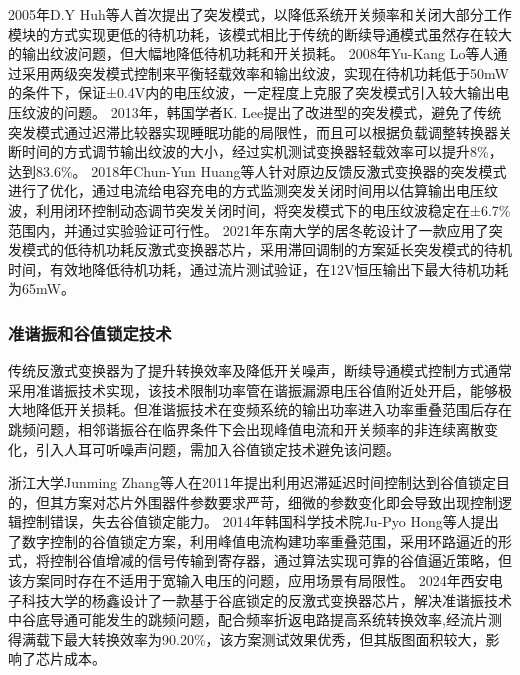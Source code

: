 2005年D.Y Huh等人\cite{choi2005_BM1}首次提出了突发模式，以降低系统开关频率和关闭大部分工作模块的方式实现更低的待机功耗，该模式相比于传统的断续导通模式虽然存在较大的输出纹波问题，但大幅地降低待机功耗和开关损耗。
2008年Yu-Kang Lo等人\cite{lo2008_BM2}通过采用两级突发模式控制来平衡轻载效率和输出纹波，实现在待机功耗低于50mW的条件下，保证±0.4V内的电压纹波，一定程度上克服了突发模式引入较大输出电压纹波的问题。
2013年，韩国学者K. Lee\cite{lee2013improvement_BM}提出了改进型的突发模式，避免了传统突发模式通过迟滞比较器实现睡眠功能的局限性，而且可以根据负载调整转换器关断时间的方式调节输出纹波的大小，经过实机测试变换器轻载效率可以提升8\%，达到83.6\%。
2018年Chun-Yun Huang等人\cite{huang2018primary_BM}针对原边反馈反激式变换器的突发模式进行了优化，通过电流给电容充电的方式监测突发关闭时间用以估算输出电压纹波，利用闭环控制动态调节突发关闭时间，将突发模式下的电压纹波稳定在±6.7\%范围内，并通过实验验证可行性。
2021年东南大学的居冬乾\cite{1022468700.nh}设计了一款应用了突发模式的低待机功耗反激式变换器芯片，采用滞回调制的方案延长突发模式的待机时间，有效地降低待机功耗，通过流片测试验证，在12V恒压输出下最大待机功耗为65mW。

\subsubsection{准谐振和谷值锁定技术}

传统反激式变换器为了提升转换效率及降低开关噪声，断续导通模式控制方式通常采用准谐振技术\cite{kwon2010single,li2022adaptive,xue2022implementation,tran2024development}实现，该技术限制功率管在谐振漏源电压谷值附近处开启，能够极大地降低开关损耗。但准谐振技术在变频系统的输出功率进入功率重叠范围后存在跳频问题，相邻谐振谷在临界条件下会出现峰值电流和开关频率的非连续离散变化，引入人耳可听噪声问题，需加入谷值锁定技术避免该问题。

浙江大学Junming Zhang等人\cite{zhang2011_vallye_switch1}在2011年提出利用迟滞延迟时间控制达到谷值锁定目的，但其方案对芯片外围器件参数要求严苛，细微的参数变化即会导致出现控制逻辑控制错误，失去谷值锁定能力。
2014年韩国科学技术院Ju-Pyo Hong等人\cite{hong2014_vallye_switch2}提出了数字控制的谷值锁定方案，利用峰值电流构建功率重叠范围，采用环路逼近的形式，将控制谷值增减的信号传输到寄存器，通过算法实现可靠的谷值逼近策略，但该方案同时存在不适用于宽输入电压的问题，应用场景有局限性。
2024年西安电子科技大学的杨鑫\cite{1025242407.nh}设计了一款基于谷底锁定的反激式变换器芯片，解决准谐振技术中谷底导通可能发生的跳频问题，配合频率折返电路提高系统转换效率,经流片测得满载下最大转换效率为90.20\%，该方案测试效果优秀，但其版图面积较大，影响了芯片成本。

